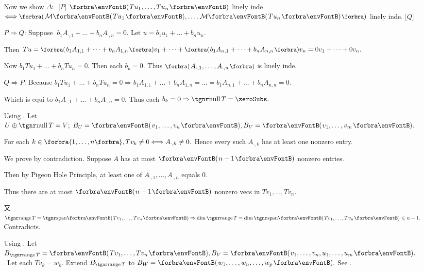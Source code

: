 Now we show $\Delta:\,$ [$P$] $\Par{Tu_1,\dots,Tu_n}$ linely inde $\Longleftrightarrow\BigPar{\Mt{Tu_1},\dots,\Mt{Tu_n}}$ linely inde. [$Q$]\vspace{2pt}\par\quad
$P\Rightarrow Q:$\,\;Suppose $\;b_1A_{\cdot,1}+\dots+b_nA_{\cdot,n}=0.$ \;Let $u=b_1u_1+\dots+b_nu_n.$\par\quad
{}Then $Tu=\BigPar{b_1A_{1,1}+\dots+b_nA_{1,n}}v_1+\dots+\BigPar{b_1A_{n,1}+\dots+b_nA_{n,n}}v_n=0v_1+\dots+0v_n.$\par\quad
{}Now $b_1Tu_1+\dots+b_nTu_n=0.$ Then each $b_k=0.$ Thus $\BigPar{A_{\cdot,1},\dots,A_{\cdot,n}}$ is linely inde.\vspace{4pt}\par\quad
$Q\Rightarrow P:$\,\;Because $b_1Tu_1+\dots+b_nTu_n=0\Rightarrow b_1A_{1,1}+\dots+b_nA_{1,n}=\dots=b_1A_{n,1}+\dots+b_nA_{n,n}=0.$\par\quad
{}Which is equi to $b_1A_{\cdot,1}+\dots+b_nA_{\cdot,n}=0.$ Thus each $b_k=0\Rightarrow\null T=\zeroSubs.$\PfEnd
\SepLine\pagebreak

\par\quad
Using . Let $U\oplus\null T=V;\;B_U=\Par{v_1,\dots,v_n},B_V=\Par{v_1,\dots,v_m}.$\par\quad
For each $k\in\Bra{1,\dots,n},Tv_k\neq 0\Longleftrightarrow A_{\cdot,k}\neq 0.$ Hence every such $A_{\cdot,k}$ has at least one nonzero entry.\PfEnd\vspace{4pt}\par\quad
\Or We prove by contradiction. Suppose $A$ has at most $\Par{n-1}$ nonzero entries.\par\quad
Then by Pigeon Hole Principle, at least one of $A_{\cdot,1},\dots,A_{\cdot,n}$ equals $0$.\par\quad
Thus there are at most $\Par{n-1}$ nonzero vecs in $Tv_{1},\dots,Tv_n.$\par\quad
又 $\range T=\Span{Tv_{1},\dots,Tv_n}\Rightarrow\dim\range T=\dim\Span{Tv_{1},\dots,Tv_n}\leqslant n-1.$ Contradicts.\PfEnd
\SepLine

Using . Let $B_{\range T}=\Par{Tv_1,\dots,Tv_n},B_V=\Par{v_1,\dots,v_n,u_1,\dots,u_m}.$\PfEnd\vspace{2pt}
\Comment \,\,\,Let each $Tv_k=w_k.$ Extend $B_{\range T}$ to $B_W=\Par{w_1,\dots,w_n,\dots,w_p}.$ See .
\SepLine

